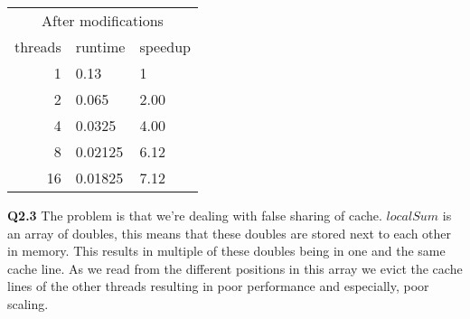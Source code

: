 \documentclass[12pt]{report}
\begin{document}
\begin{tabularx}{5.5cm}{r|l|l}
\multicolumn{3}{c}{After modifications} \\
threads&runtime&speedup\\\hline
1&0.13&1\\
2&0.065&2.00\\
4&0.0325&4.00\\
8&0.02125&6.12\\
16&0.01825&7.12
\end{tabularx}\par
\textbf{Q2.3} The problem is that we're dealing with false sharing of cache. $localSum$ is an array of doubles, this means that these doubles are stored next to each other in memory. This results in multiple of these doubles being in one and the same cache line. As we read from the different positions in this array we evict the cache lines of the other threads resulting in poor performance and especially, poor scaling.
\end{document}
